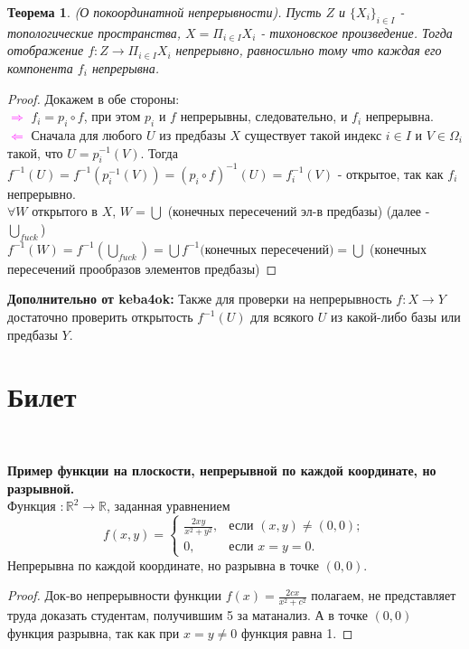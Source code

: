 \documentclass[a4paper,100pt]{article}
\theoremstyle{indented}
\newtheorem{theorem}{Теорема}
\begin{document}
\begin{theorem}
    (О покоординатной непрерывности). Пусть $Z$ и $\{X_i\}_{i\in I}$ - топологические пространства, $X = \Pi_{i\in I}X_i$ - тихоновское произведение. Тогда отображение $f: Z\rightarrow \Pi_{i\in I}X_i$ непрерывно, равносильно тому что каждая его компонента $f_i$ непрерывна.
\end{theorem}

\begin{proof} Докажем в обе стороны:\\

    \textcolor{magenta}{$\Rightarrow$} $f_i = p_i \circ f$, при этом $p_i$ и $f$ непрерывны, следовательно, и $f_i$ непрерывна.\\

    \textcolor{magenta}{$\Leftarrow$} Сначала для любого $U$ из предбазы $X$ существует такой индекс $i\in I$ и $V\in \Omega_i$ такой, что $U=p_i^{-1}(V)$. Тогда $f^{-1}(U)=f^{-1}(p_i^{-1}(V))=(p_i\circ f)^{-1}(U)= f_i^{-1}(V) $ - открытое, так как $f_i$ непрерывно. \\

    $\forall W$ открытого в $X$, $W = \bigcup $ (конечных пересечений эл-в предбазы) (далее - $\bigcup_{fuck}$)\\

    $f^{-1}(W)=f^{-1}(\bigcup_{fuck}) = \bigcup f^{-1}($конечных пересечений$)=\bigcup $ (конечных пересечений прообразов элементов предбазы)

\end{proof}

\textbf{Дополнительно от keba4ok:} Также для проверки на непрерывность $f: X \to Y$ достаточно проверить открытость $f^{-1}(U)$ для всякого $U$ из какой-либо базы или предбазы $Y$.

\section{Билет} \

\medskip

\textbf{Пример функции на плоскости, непрерывной по каждой координате, но разрывной.}\\
    
    Функция $: \mathbb R^2 \rightarrow \mathbb R$, заданная уравнением 
    \[
    f(x,y) = 
    \begin{cases} 
        \frac{2xy}{x^2+y^2}, &\text{если } (x,y) \neq (0,0); \\
        0, &\text{если } x = y = 0.
    \end{cases}
    \]
    Непрерывна по каждой координате, но разрывна в точке $(0,0)$.
    \begin{proof}
        Док-во непрерывности функции $f(x) = \frac{2cx}{x^2+c^2}$ полагаем, не представляет труда доказать студентам, получившим 5 за матанализ. А в точке $(0,0)$ функция разрывна, так как при $x = y \neq 0$ функция равна 1. 
    \end{proof}
\end{document}
